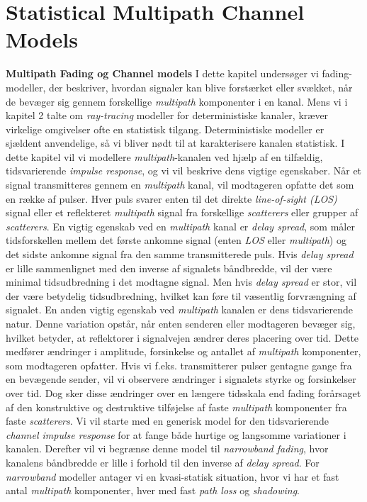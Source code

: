 \documentclass[a4paper,12pt]{book}
\begin{document}
	\chapter{Statistical Multipath Channel Models}
	\textbf{Multipath Fading og Channel models}
	\newline\noindent
	I dette kapitel undersøger vi fading-modeller, der beskriver, hvordan signaler kan blive forstærket eller svækket, når de bevæger sig gennem forskellige \textit{multipath} komponenter i en kanal. Mens vi i kapitel 2 talte om \textit{ray-tracing} modeller for deterministiske kanaler, kræver virkelige omgivelser ofte en statistisk tilgang. Deterministiske modeller er sjældent anvendelige, så vi bliver nødt til at karakterisere kanalen statistisk. I dette kapitel vil vi modellere \textit{multipath}-kanalen ved hjælp af en tilfældig, tidsvarierende \textit{impulse response}, og vi vil beskrive dens vigtige egenskaber.
	\newline\newline
	Når et signal transmitteres gennem en \textit{multipath} kanal, vil modtageren opfatte det som en række af pulser. Hver puls svarer enten til det direkte \textit{line-of-sight (LOS)} signal eller et reflekteret \textit{multipath} signal fra forskellige \textit{scatterers} eller grupper af \textit{scatterers}. En vigtig egenskab ved en \textit{multipath} kanal er \textit{delay spread}, som måler tidsforskellen mellem det første ankomne signal (enten \textit{LOS} eller \textit{multipath}) og det sidste ankomne signal fra den samme transmitterede puls. Hvis \textit{delay spread} er lille sammenlignet med den inverse af signalets båndbredde, vil der være minimal tidsudbredning i det modtagne signal. Men hvis \textit{delay spread} er stor, vil der være betydelig tidsudbredning, hvilket kan føre til væsentlig forvrængning af signalet.
	\newline\newline
	En anden vigtig egenskab ved \textit{multipath} kanalen er dens tidsvarierende natur. Denne variation opstår, når enten senderen eller modtageren bevæger sig, hvilket betyder, at reflektorer i signalvejen ændrer deres placering over tid. Dette medfører ændringer i amplitude, forsinkelse og antallet af \textit{multipath} komponenter, som modtageren opfatter. Hvis vi f.eks. transmitterer pulser gentagne gange fra en bevægende sender, vil vi observere ændringer i signalets styrke og forsinkelser over tid. Dog sker disse ændringer over en længere tidsskala end fading forårsaget af den konstruktive og destruktive tilføjelse af faste \textit{multipath} komponenter fra faste \textit{scatterers}.
	\newline\newline
	Vi vil starte med en generisk model for den tidsvarierende \textit{channel impulse response} for at fange både hurtige og langsomme variationer i kanalen. Derefter vil vi begrænse denne model til \textit{narrowband fading}, hvor kanalens båndbredde er lille i forhold til den inverse af \textit{delay spread}. For \textit{narrowband} modeller antager vi en kvasi-statisk situation, hvor vi har et fast antal \textit{multipath} komponenter, hver med fast \textit{path loss} og \textit{shadowing}. 
\end{document}
